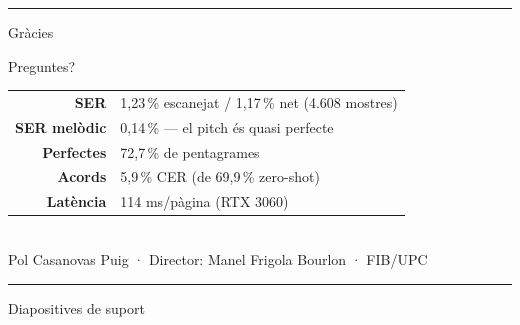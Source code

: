 \documentclass[aspectratio=169,10pt]{beamer}
\newcommand{\displayfont}{\AdwaitaLight}
\begin{document}
\begin{frame}[plain]
  \centering
  \vspace{1.1cm}
  {\color{accent}\rule{3em}{2.6pt}}\par
  \vspace{0.5cm}
  {\displayfont\fontsize{34}{38}\selectfont\color{ink} Gràcies\par}
  \vspace{0.3cm}
  {\large\color{muted} Preguntes?\par}
  \vspace{1.0cm}
  {\renewcommand{\arraystretch}{1.35}\small
  \begin{tabular}{@{}r l@{}}
    \textbf{SER}        & 1,23\,\% escanejat / 1,17\,\% net \;(4.608 mostres) \\
    \textbf{SER melòdic} & 0,14\,\% — el pitch és quasi perfecte \\
    \textbf{Perfectes}  & 72,7\,\% de pentagrames \\
    \textbf{Acords}     & 5,9\,\% CER (de 69,9\,\% zero-shot) \\
    \textbf{Latència}   & 114 ms/pàgina (RTX 3060) \\
  \end{tabular}}
  \vspace{0.7cm}\\
  {\footnotesize\color{muted} Pol Casanovas Puig · Director: Manel Frigola Bourlon · FIB/UPC}
\end{frame}

\appendix
\begin{frame}[plain]
  \centering
  \vspace{2.2cm}
  {\color{accent}\rule{2.4em}{2.4pt}}\par
  \vspace{0.5cm}
  {\displayfont\fontsize{24}{28}\selectfont\color{ink} Diapositives de suport\par}
\end{frame}
\end{document}
